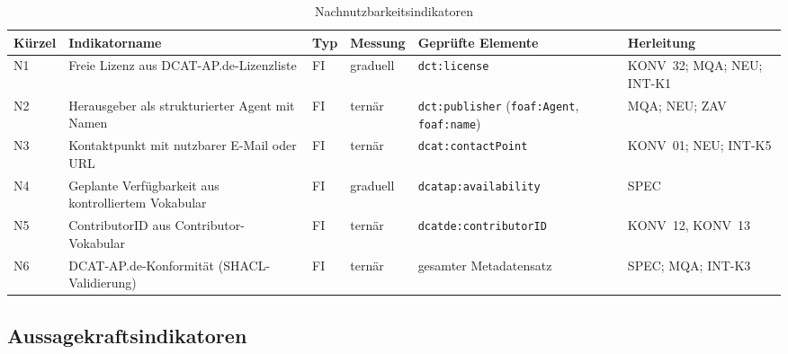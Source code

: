 \begin{table}[H]
\centering
\scriptsize
\renewcommand{\arraystretch}{1.2}
\begin{tabular}{p{} p{} p{} p{} p{} >{\raggedright\arraybackslash}p{}}
    \hline
    \textbf{Kürzel} & \textbf{Indikatorname} & \textbf{Typ} & \textbf{Messung} & \textbf{Geprüfte Elemente} & \textbf{Herleitung} \\
    \hline
    N1 & Freie Lizenz aus DCAT-AP.de-Lizenzliste & FI & graduell & \texttt{dct:license} & KONV~32; MQA; NEU; INT-K1 \\
    \hline
    N2 & Herausgeber als strukturierter Agent mit Namen & FI & ternär & \texttt{dct:publisher} (\texttt{foaf:Agent}, \texttt{foaf:name}) & MQA; NEU; ZAV \\
    \hline
    N3 & Kontaktpunkt mit nutzbarer E-Mail oder URL & FI & ternär & \texttt{dcat:contactPoint} & KONV~01; NEU; INT-K5 \\
    \hline
    N4 & Geplante Verfügbarkeit aus kontrolliertem Vokabular & FI & graduell & \texttt{dcatap:availability} & SPEC \\
    \hline
    N5 & ContributorID aus Contributor-Vokabular & FI & ternär & \texttt{dcatde:contributorID} & KONV~12, KONV~13 \\
    \hline
    N6 & DCAT-AP.de-Konformität (SHACL-Validierung) & FI & ternär & gesamter Metadatensatz & SPEC; MQA; INT-K3 \\
    \hline
\end{tabular}
\caption{Nachnutzbarkeitsindikatoren}
\label{tab:nachnutzbarkeitsindikatoren}
\end{table}

\subsection{Aussagekraftsindikatoren}

